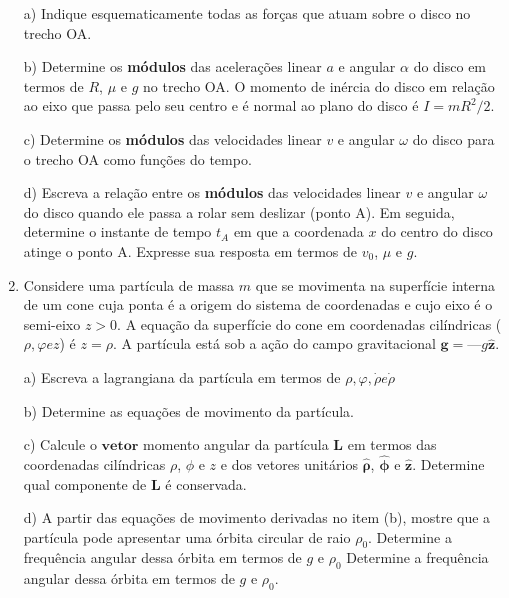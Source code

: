 \begin{enumerate}[start=1,label={\bfseries Q\arabic*.}]
a) Indique esquematicamente todas as forças que atuam sobre o disco no trecho OA.

\resposta

b) Determine os \textbf{módulos} das acelerações linear $a$ e angular $\alpha$ do disco em termos de $R$, $\mu$ e $g$ no trecho OA. O momento de inércia do disco em relação ao eixo que passa pelo seu centro e é normal ao plano do disco é $I = mR^{2}/2$.

\resposta

c) Determine os \textbf{módulos} das velocidades linear $v$ e angular $\omega$ do disco para o trecho OA como funções do tempo.

\resposta

d) Escreva a relação entre os \textbf{módulos} das velocidades linear $v$ e angular $\omega$ do disco quando ele passa a rolar sem deslizar (ponto A). Em seguida, determine o instante de tempo $t_{A}$ em que a coordenada $x$ do centro do disco atinge o ponto A. Expresse sua resposta em termos de $v_{0}$, $\mu$ e $g$.

\resposta







\item Considere uma partícula de massa $m$ que se movimenta na superfície interna de um cone cuja ponta é a origem do sistema de coordenadas e cujo eixo é o semi-eixo $z > 0$. A equação da superfície do cone em coordenadas cilíndricas ($\rho, \varphi e z$) é $z = \rho$. A partícula está sob a ação do campo gravitacional $\mathbf{g} = —g\hat{\mathbf{z}}$.


a) Escreva a lagrangiana da partícula em termos de $\rho, \varphi, \dot{\rho} e \dot{\rho}$

\resposta

b) Determine as equações de movimento da partícula.

\resposta

c) Calcule o $\mathbf{vetor}$ momento angular da partícula $\mathbf{L}$ em termos das coordenadas cilíndricas $\rho$, $\phi$ e $z$ e dos vetores unitários $\hat{\mathbf{\rho}}$, $\hat{\mathbf{\phi}}$ e $\hat{\mathbf{z}}$. Determine qual componente de $\mathbf{L}$ é conservada.

\resposta

d) A partir das equações de movimento derivadas no item (b), mostre que a partícula pode apresentar uma órbita circular de raio $\rho_{0}$. Determine a frequência angular dessa órbita em termos de $g$ e $\rho_{0}$ Determine a frequência angular dessa órbita em termos de $g$ e $\rho_{0}$.


\end{enumerate}
